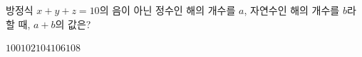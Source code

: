 방정식 $x+y+z=10$의 음이 아닌 정수인 해의 개수를 $a$, 자연수인 해의 개수를 $b$라 할 때, $a+b$의 값은?
\begin{choices32}{$100$}{$102$}{$104$}{$106$}{$108$}\end{choices32}
